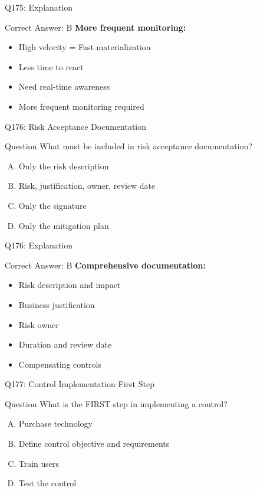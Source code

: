 \documentclass{beamer}
\begin{document}
	\begin{frame}{Q175: Explanation}
		\begin{block}{Correct Answer: B}
			\textbf{More frequent monitoring:}
			\begin{itemize}
				\item High velocity = Fast materialization
				\item Less time to react
				\item Need real-time awareness
				\item More frequent monitoring required
			\end{itemize}
		\end{block}
	\end{frame}
	
	\begin{frame}{Q176: Risk Acceptance Documentation}
		\begin{block}{Question}
			What must be included in risk acceptance documentation?
		\end{block}
		\begin{enumerate}[(A)]
			\item Only the risk description
			\item Risk, justification, owner, review date
			\item Only the signature
			\item Only the mitigation plan
		\end{enumerate}
	\end{frame}
	
	\begin{frame}{Q176: Explanation}
		\begin{block}{Correct Answer: B}
			\textbf{Comprehensive documentation:}
			\begin{itemize}
				\item Risk description and impact
				\item Business justification
				\item Risk owner
				\item Duration and review date
				\item Compensating controls
			\end{itemize}
		\end{block}
	\end{frame}
	
	\begin{frame}{Q177: Control Implementation First Step}
		\begin{block}{Question}
			What is the FIRST step in implementing a control?
		\end{block}
		\begin{enumerate}[(A)]
			\item Purchase technology
			\item Define control objective and requirements
			\item Train users
			\item Test the control
		\end{enumerate}
	\end{frame}
	
\end{document}
